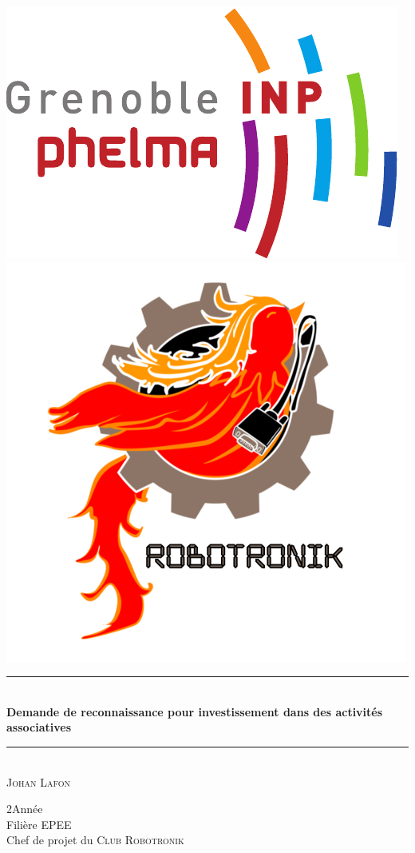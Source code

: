 \begin{titlepage}
\includegraphics[scale=0.45]{Public/logo_phelma.pdf}\hfill\includegraphics[scale=0.55]{Public/logo_robotronik.png}
\begin{center}
    \vspace*{2cm}
    \rule{\linewidth}{0.5mm}\\[0.4cm]
    {\huge\bfseries Demande de reconnaissance pour investissement dans des activités associatives\\
    [0.4cm]}\rule{\linewidth}{0.5mm}\\[1.0cm]
    \large{\textsc{Johan Lafon}}
    \begin{flushright} \large
        2\ieme Année \\
        Filière \textsc{EPEE} \\
        Chef de projet du \textsc{Club Robotronik}\\
    \end{flushright}
    \vfill
\end{center}
\end{titlepage}
